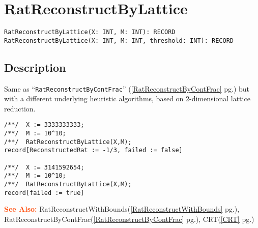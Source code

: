 \documentclass[a4paper]{mybook}
\newenvironment{command}{}{} %
\newcommand\SeeAlso{\par\textcolor{OrangeRed}{\textbf{\large See Also: }}}
\begin{document}
\section{RatReconstructByLattice}
\label{RatReconstructByLattice}
\begin{command} %


\begin{Verbatim}[label=syntax, rulecolor=\color{MidnightBlue},
frame=single]
RatReconstructByLattice(X: INT, M: INT): RECORD
RatReconstructByLattice(X: INT, M: INT, threshold: INT): RECORD
\end{Verbatim}


\subsection*{Description}

Same as ``\verb&RatReconstructByContFrac&'' (\ref{RatReconstructByContFrac} pg.\pageref{RatReconstructByContFrac}) but with a different
underlying heuristic algorithms, based on 2-dimensional lattice reduction.  
\begin{Verbatim}[label=example, rulecolor=\color{PineGreen}, frame=single]
/**/  X := 3333333333;
/**/  M := 10^10;
/**/  RatReconstructByLattice(X,M);
record[ReconstructedRat := -1/3, failed := false]

/**/  X := 3141592654;
/**/  M := 10^10;
/**/  RatReconstructByLattice(X,M);
record[failed := true]
\end{Verbatim}


\SeeAlso %
  RatReconstructWithBounds(\ref{RatReconstructWithBounds} pg.\pageref{RatReconstructWithBounds}), 
    RatReconstructByContFrac(\ref{RatReconstructByContFrac} pg.\pageref{RatReconstructByContFrac}), 
    CRT(\ref{CRT} pg.\pageref{CRT})
\end{command} %
\end{document}
